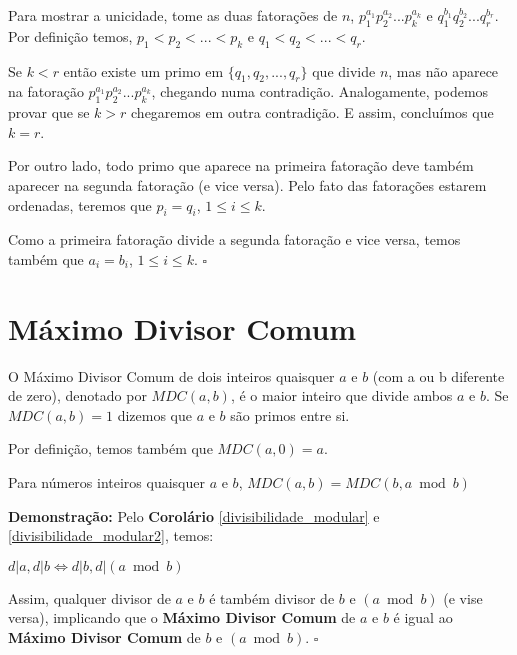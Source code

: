 Para mostrar a unicidade, tome as duas fatorações de $n$, $p_1^{a_1}p_2^{a_2}...p_k^{a_k}$ e $q_1^{b_1}q_2^{b_2}...q_r^{b_r}$.
Por definição temos, $p_1 < p_2 < ... < p_k$ e $q_1 < q_2 < ... < q_r$. 

Se $k<r$ então existe um primo em $\{q_1,q_2,...,q_r\}$ que divide $n$, mas não aparece na fatoração $p_1^{a_1}p_2^{a_2}...p_k^{a_k}$,
chegando numa contradição. Analogamente, podemos provar que se $k>r$ chegaremos em outra contradição. E assim, concluímos que $k=r$.

Por outro lado, todo primo que aparece na primeira fatoração deve também aparecer na segunda fatoração (e vice versa). Pelo fato das
fatorações estarem ordenadas, teremos que $p_i = q_i$, $1\leq i\leq k$.



 Como a primeira fatoração divide a segunda fatoração e vice versa, temos também que $a_i = b_i$, $1\leq i\leq k$. $\square$





\section{Máximo Divisor Comum}

\begin{definition}
O Máximo Divisor Comum de dois inteiros quaisquer $a$ e $b$ (com a ou b diferente de zero), denotado por $MDC(a,b)$, é o maior inteiro que divide ambos $a$ e $b$. 
Se $MDC(a,b) = 1$ dizemos que $a$ e $b$ são primos entre si.

Por definição, temos também que $MDC(a,0) = a$.
\end{definition}


\begin{corollary}\label{gcd_modular}
Para números inteiros quaisquer $a$ e $b$, $MDC(a,b) = MDC(b, a \bmod b)$
\end{corollary}
\textbf{Demonstração:}
Pelo \textbf{Corolário} \autoref{divisibilidade_modular} e \autoref{divisibilidade_modular2}, temos:

$d|a, d|b \Leftrightarrow d|b, d|(a \bmod b)$

Assim, qualquer divisor de $a$ e $b$ é também divisor de $b$ e $(a \bmod b)$ (e vise versa), implicando que o \textbf{Máximo Divisor Comum} de $a$ e $b$
é igual ao \textbf{Máximo Divisor Comum} de $b$ e $(a \bmod b)$. $\square$



